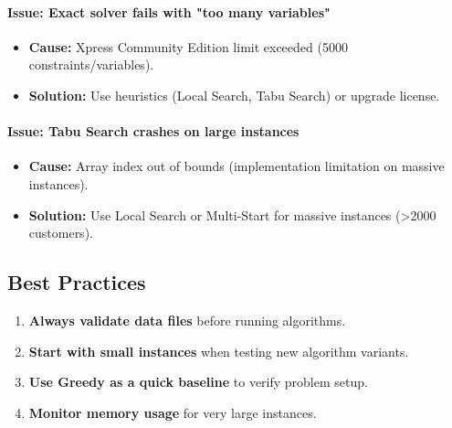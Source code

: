 \documentclass[11pt,a4paper]{article}
\begin{document}
\paragraph{Issue: Exact solver fails with "too many variables"}
\begin{itemize}
  \item \textbf{Cause:} Xpress Community Edition limit exceeded (5000 constraints/variables).
  \item \textbf{Solution:} Use heuristics (Local Search, Tabu Search) or upgrade license.
\end{itemize}

\paragraph{Issue: Tabu Search crashes on large instances}
\begin{itemize}
  \item \textbf{Cause:} Array index out of bounds (implementation limitation on massive instances).
  \item \textbf{Solution:} Use Local Search or Multi-Start for massive instances (>2000 customers).
\end{itemize}

\subsection{Best Practices}
\begin{enumerate}
  \item \textbf{Always validate data files} before running algorithms.
  \item \textbf{Start with small instances} when testing new algorithm variants.
  \item \textbf{Use Greedy as a quick baseline} to verify problem setup.
  \item \textbf{Monitor memory usage} for very large instances.
\end{enumerate}
\end{document}
